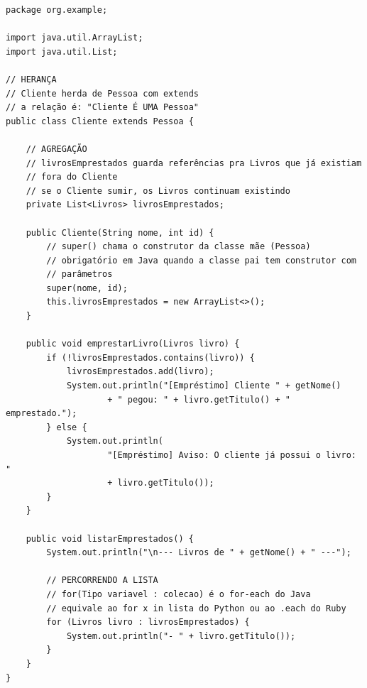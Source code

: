 \begin{lstlisting}[style=java, caption={Exemplo de Aplicação de POO em Java: \texttt{Cliente.java}}]
package org.example;

import java.util.ArrayList;
import java.util.List;

// HERANÇA
// Cliente herda de Pessoa com extends
// a relação é: "Cliente É UMA Pessoa"
public class Cliente extends Pessoa {

    // AGREGAÇÃO
    // livrosEmprestados guarda referências pra Livros que já existiam
    // fora do Cliente
    // se o Cliente sumir, os Livros continuam existindo
    private List<Livros> livrosEmprestados;

    public Cliente(String nome, int id) {
        // super() chama o construtor da classe mãe (Pessoa)
        // obrigatório em Java quando a classe pai tem construtor com
        // parâmetros
        super(nome, id);
        this.livrosEmprestados = new ArrayList<>();
    }

    public void emprestarLivro(Livros livro) {
        if (!livrosEmprestados.contains(livro)) {
            livrosEmprestados.add(livro);
            System.out.println("[Empréstimo] Cliente " + getNome()
                    + " pegou: " + livro.getTitulo() + " emprestado.");
        } else {
            System.out.println(
                    "[Empréstimo] Aviso: O cliente já possui o livro: "
                    + livro.getTitulo());
        }
    }

    public void listarEmprestados() {
        System.out.println("\n--- Livros de " + getNome() + " ---");

        // PERCORRENDO A LISTA
        // for(Tipo variavel : colecao) é o for-each do Java
        // equivale ao for x in lista do Python ou ao .each do Ruby
        for (Livros livro : livrosEmprestados) {
            System.out.println("- " + livro.getTitulo());
        }
    }
}
\end{lstlisting}

